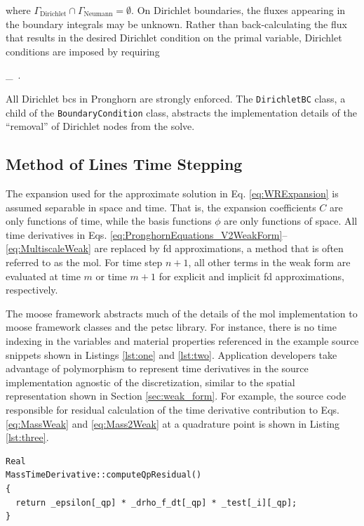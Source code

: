 \noindent where \(\Gamma_\text{Dirichlet}\cap\Gamma_\text{Neumann}=\emptyset\). On Dirichlet boundaries, the fluxes appearing in the boundary integrals may be unknown. Rather than back-calculating the flux that results in the desired Dirichlet condition on the primal variable, Dirichlet conditions are imposed by requiring

\beq
{}\Gamma\in\Gamma_\ .
\eeq

\noindent All Dirichlet \glspl{bc} in Pronghorn are strongly enforced. The \texttt{DirichletBC} class, a child of the \texttt{BoundaryCondition} class, abstracts the implementation details of the ``removal'' of Dirichlet nodes from the solve.

\subsection{Method of Lines Time Stepping}
\label{sec:mol}

The expansion used for the approximate solution in Eq. \eqref{eq:WRExpansion} is assumed separable in space and time. That is, the expansion coefficients \(C\) are only functions of time, while the basis functions \(\phi\) are only functions of space. All time derivatives in Eqs. \eqref{eq:PronghornEquations_V2WeakForm}--\eqref{eq:MultiscaleWeak} are replaced by \gls{fd} approximations, a method that is often referred to as the \gls{mol}. For time step \(n+1\), all other terms in the weak form are evaluated at time \(m\) or time \(m+1\) for explicit and implicit \gls{fd} approximations, respectively.

The \gls{moose} framework abstracts much of the details of the \gls{mol} implementation to \gls{moose} framework classes and the \gls{petsc} library. For instance, there is no time indexing in the variables and material properties referenced in the example source snippets shown in Listings \ref{lst:one} and \ref{lst:two}. Application developers take advantage of polymorphism to represent time derivatives in the source implementation agnostic of the discretization, similar to the spatial representation shown in Section \ref{sec:weak_form}. For example, the source code responsible for residual calculation of the time derivative contribution to Eqs. \eqref{eq:MassWeak} and \eqref{eq:Mass2Weak} at a quadrature point is shown in Listing \ref{lst:three}.

\vspace{1em}
\begin{minipage}[c]{0.92\linewidth}
\begin{lstlisting}[caption={Pronghorn source code calculation of \(\int_\Omega\epsilon\frac{\partial\rho_f}{\partial t}\psi d\Omega\).},captionpos=b,label={lst:three}]
Real
MassTimeDerivative::computeQpResidual()
{
  return _epsilon[_qp] * _drho_f_dt[_qp] * _test[_i][_qp];
}
\end{lstlisting}
\end{minipage}

